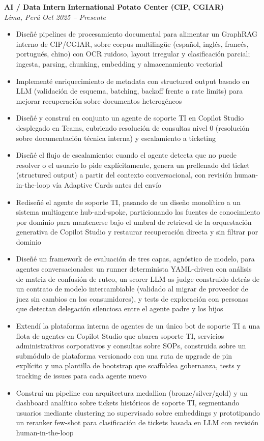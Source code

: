 \documentclass[a4paper,10pt]{article}
\begin{document}
\textbf{AI / Data Intern} \hfill \textbf{International Potato Center (CIP, CGIAR)}\\
\textit{Lima, Perú} \hfill \textit{Oct 2025 -- Presente}
\begin{itemize}[leftmargin=1.2em, itemsep=1pt, topsep=2pt]
  \item Diseñé pipelines de procesamiento documental para alimentar un GraphRAG interno de CIP/CGIAR, sobre corpus multilingüe (español, inglés, francés, portugués, chino) con OCR ruidoso, layout irregular y clasificación parcial; ingesta, parsing, chunking, embedding y almacenamiento vectorial
  \item Implementé enriquecimiento de metadata con structured output basado en LLM (validación de esquema, batching, backoff frente a rate limits) para mejorar recuperación sobre documentos heterogéneos
  \item Diseñé y construí en conjunto un agente de soporte TI en Copilot Studio desplegado en Teams, cubriendo resolución de consultas nivel 0 (resolución sobre documentación técnica interna) y escalamiento a ticketing
  \item Diseñé el flujo de escalamiento: cuando el agente detecta que no puede resolver o el usuario lo pide explícitamente, genera un prellenado del ticket (structured output) a partir del contexto conversacional, con revisión human-in-the-loop vía Adaptive Cards antes del envío
  \item Rediseñé el agente de soporte TI, pasando de un diseño monolítico a un sistema multiagente hub-and-spoke, particionando las fuentes de conocimiento por dominio para mantenerse bajo el umbral de retrieval de la orquestación generativa de Copilot Studio y restaurar recuperación directa y sin filtrar por dominio
  \item Diseñé un framework de evaluación de tres capas, agnóstico de modelo, para agentes conversacionales: un runner determinista YAML-driven con análisis de matriz de confusión de ruteo, un scorer LLM-as-judge construido detrás de un contrato de modelo intercambiable (validado al migrar de proveedor de juez sin cambios en los consumidores), y tests de exploración con personas que detectan delegación silenciosa entre el agente padre y los hijos
  \item Extendí la plataforma interna de agentes de un único bot de soporte TI a una flota de agentes en Copilot Studio que abarca soporte TI, servicios administrativos corporativos y consultas sobre SOPs, construida sobre un submódulo de plataforma versionado con una ruta de upgrade de pin explícito y una plantilla de bootstrap que scaffoldea gobernanza, tests y tracking de issues para cada agente nuevo
  \item Construí un pipeline con arquitectura medallion (bronze/silver/gold) y un dashboard analítico sobre tickets históricos de soporte TI, segmentando usuarios mediante clustering no supervisado sobre embeddings y prototipando un reranker few-shot para clasificación de tickets basada en LLM con revisión human-in-the-loop
\end{itemize}
\end{document}
